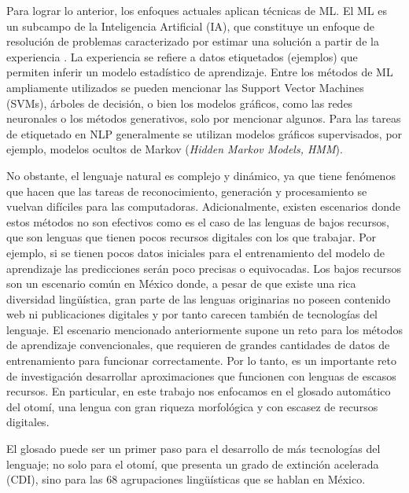 \documentclass[letterpaper,12pt,oneside]{book}
\newcommand{\note}[4][]{\todo[author=#2,color=#3,size=\scriptsize,fancyline,caption={},#1]{#4}} %
\newcommand{\diego}[2][]{\note[#1]{Diego}{blue!40}{#2}}
\newcommand{\Diego}[2][]{\diego[inline,#1]{#2}\noindent}
\theoremstyle{definition}
\begin{document}
	

	Para lograr lo anterior, los enfoques actuales aplican técnicas de ML. El ML es un subcampo de la Inteligencia Artificial (IA), que constituye un enfoque de resolución de problemas caracterizado por estimar una solución a partir de la experiencia \citep{mitchell1997machine}.  La experiencia se refiere a datos etiquetados (ejemplos) que permiten inferir un modelo estadístico de aprendizaje. Entre los métodos de ML ampliamente utilizados se pueden mencionar las Support Vector Machines (SVMs), árboles de decisión, o bien los modelos gráficos, como las redes neuronales o los métodos generativos, solo por mencionar algunos. Para las tareas de etiquetado en NLP generalmente se utilizan modelos gráficos supervisados, por ejemplo, modelos ocultos de Markov (\textit{Hidden Markov Models, HMM}).

	

	No obstante, el lenguaje natural es complejo y dinámico, ya que tiene fenómenos que hacen que las tareas de reconocimiento, generación y procesamiento se vuelvan difíciles para las computadoras. Adicionalmente, existen escenarios donde estos métodos no son efectivos como es el caso de las lenguas de bajos recursos, que son lenguas que tienen pocos recursos digitales con los que trabajar. Por ejemplo, si se tienen pocos datos iniciales para el entrenamiento del modelo de aprendizaje las predicciones serán poco precisas o equivocadas. Los bajos recursos son un escenario común en México donde, a pesar de que existe una rica diversidad lingüística, gran parte de las lenguas originarias no poseen contenido web ni publicaciones digitales y por tanto carecen también de tecnologías del lenguaje.  El escenario mencionado anteriormente supone un reto para los métodos de aprendizaje convencionales, que requieren de grandes cantidades de datos de entrenamiento para funcionar correctamente. Por lo tanto, es un importante reto de investigación desarrollar aproximaciones que funcionen con lenguas de escasos recursos. En particular, en este trabajo nos enfocamos en el glosado automático del otomí, una lengua con gran riqueza morfológica y con escasez de recursos digitales.

	
	El glosado puede ser un primer paso para el desarrollo de más tecnologías del lenguaje; no solo para el otomí, que presenta un grado de extinción acelerada \Diego{¿Esta cita donde la puedo encontrar?} (CDI), sino para las 68 agrupaciones lingüísticas que se hablan en México.
\end{document}
